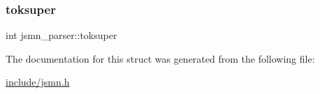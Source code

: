 \mbox{\label{structjsmn__parser_af11fcec48d9f1298909777a12f1d1e39}} 
\subsubsection{\texorpdfstring{toksuper}{toksuper}}
{\footnotesize\ttfamily int jsmn\+\_\+parser\+::toksuper}



The documentation for this struct was generated from the following file\+:\begin{DoxyCompactItemize}
\item 
\hyperlink{include_2jsmn_8h}{include/jsmn.\+h}\end{DoxyCompactItemize}
